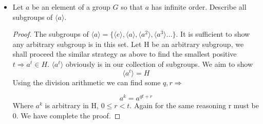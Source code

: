\documentclass[11pt, oneside]{article}
\newcommand{\Z}{\mathbb Z}
\begin{document}
\begin{enumerate}
\begin{itemize}
\begin{proof}
Let $H$ be an arbitrary subgroup of G. Such subgroup exists since $\langle 0 \rangle$ is a subgroup for $(\Z,+)$. We aim to show H is cyclic.

If $H=\{0\}$. H is trivially cyclic. 

If $H\neq \{0\}$, since $(\Z,+) = \langle 1 \rangle$, for every $a\in H$, $a= 1^t$ for some $t\in \Z$. Find the smallest positive $\hat{t}$ such that $1^{\hat{t}} \in H$. Since $H$ is a subgroup,  $\langle 1^{\hat{t}}\rangle \subseteq H$. We aim to show $\langle 1^{\hat{t}}\rangle \supseteq H$.

Take arbitrary $b= 1^k\in H$. Then by division arithmetic there exist some $q, r \in \Z \Rightarrow{}$
\[1^k= (1^{\hat{t}})^q + r\] 
Where $0\leq r <  \hat{t}$. If $0<r$, then $r\in H$ since $H$ is closed. However this contradicts our assumption that $1^\hat{t} $ is the smallest positive element in $H$. Thus $r=0 \Rightarrow{} 1^k= (1^{\hat{t}})^q \Rightarrow{} \langle 1^{\hat{t}}\rangle \supseteq H \Rightarrow{} \langle 1^{\hat{t}}\rangle = H$.
\end{proof}

The subgroup of $\Z$ can be expressed like this:
\[\{ 
kn| n\in \Z
\}\]
Where k is the smallest positive integer in this subgroup. 


\item Let $a$ be an element of a group $G$ so that $a$ has infinite order. Describe all subgroups of $\langle a \rangle$.
\begin{proof}
The subgroups of $\langle a \rangle=  
\{
\langle e \rangle, \langle a \rangle, \langle a^2 \rangle, 
\langle a^3 \rangle...
\}
$.
It is sufficient to show any arbitrary subgroup is in this set. Let H be an arbitrary subgroup, we shall proceed the similar strategy as above to find the smallest positive $t \Rightarrow{} a^t\in H$. $\langle a^t \rangle$ obviously is in our collection of subgroups. We aim to show 
\[\langle a^t \rangle =H\]
Using the division arithmetic we can find some $q, r \Rightarrow{}$

\[a^k= a^{qt+r}\]
Where $a^k$ is arbitrary in H, $0\leq r <  t$. Again for the same reasoning r must be 0. We have complete the proof. 
\end{proof}

\end{itemize}


\end{enumerate}
\end{document}
